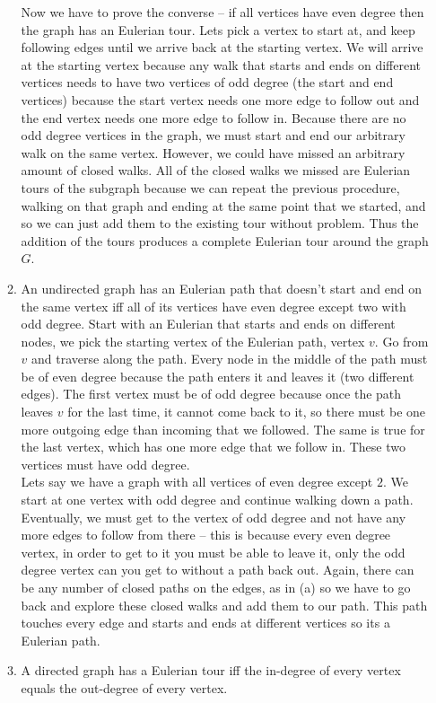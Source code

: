 \documentclass[11pt]{article}
\begin{document}
\begin{enumerate}
\begin{enumerate}
Now we have to prove the converse -- if all vertices have even degree then the graph has an Eulerian tour. Lets pick a vertex to start at, and keep following edges until we arrive back at the starting vertex. We will arrive at the starting vertex because any walk that starts and ends on different vertices needs to have two vertices of odd degree (the start and end vertices) because the start vertex needs one more edge to follow out and the end vertex needs one more edge to follow in. Because there are no odd degree vertices in the graph, we must start and end our arbitrary walk on the same vertex. However, we could have missed an arbitrary amount of closed walks. All of the closed walks we missed are Eulerian tours of the subgraph because we can repeat the previous procedure, walking on that graph and ending at the same point that we started, and so we can just add them to the existing tour without problem. Thus the addition of the tours produces a complete Eulerian tour around the graph $G$.
\item An undirected graph has an Eulerian path that doesn't start and end on the same vertex iff all of its vertices have even degree except two with odd degree. Start with an Eulerian that starts and ends on different nodes, we pick the starting vertex of the Eulerian path, vertex $v$. Go from $v$ and traverse along the path. Every node in the middle of the path must be of even degree because the path enters it and leaves it (two different edges). The first vertex must be of odd degree because once the path leaves $v$ for the last time, it cannot come back to it, so there must be one more outgoing edge than incoming that we followed. The same is true for the last vertex, which has one more edge that we follow in. These two vertices must have odd degree.\\
Lets say we have a graph with all vertices of even degree except $2$. We start at one vertex with odd degree and continue walking down a path. Eventually, we must get to the vertex of odd degree and not have any more edges to follow from there -- this is because every even degree vertex, in order to get to it you must be able to leave it, only the odd degree vertex can you get to without a path back out. Again, there can be any number of closed paths on the edges, as in (a) so we have to go back and explore these closed walks and add them to our path. This path touches every edge and starts and ends at different vertices so its a Eulerian path.
\item A directed graph has a Eulerian tour iff the in-degree of every vertex equals the out-degree of every vertex.

\end{enumerate}
\end{enumerate}
\end{document}
